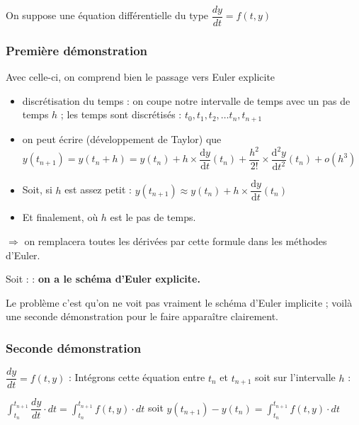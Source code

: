 \documentclass[11pt]{article}
\begin{document}
On suppose une équation différentielle du type $\dfrac{dy}{dt} = f(t,y)$

\subsubsection{Première démonstration}

Avec celle-ci, on comprend bien le passage vers Euler explicite

\begin{itemize}
 \item discrétisation du temps : on coupe notre intervalle de temps avec un pas de temps $h$ ; les temps sont discrétisés : $t_0, t_1, t_2,\ldots t_n, t_{n+1}$
 \item on peut écrire (développement de Taylor) que $y(t_{n+1}) = y(t_n+h) = y(t_n)+h\times \dfrac{\text{d}y}{\text{d}t}(t_n) + \dfrac{h^2}{{2!}}\times \dfrac{\text{d}^2y}{\text{d}t^2}(t_n)+o(h^3)$
 \item Soit, si $h$ est assez petit : $y(t_{n+1}) \approx y(t_n)+h\times \dfrac{\text{d}y}{\text{d}t}(t_n)$
 \item Et finalement,  où $h$ est le pas de temps.
\end{itemize}

$\Longrightarrow$ on remplacera toutes les dérivées par cette formule dans les méthodes d'Euler.



Soit :  :  \textbf{on a le schéma d'Euler explicite.}




Le problème c'est qu'on ne voit pas vraiment le schéma d'Euler implicite ; voilà une seconde démonstration pour le faire apparaître clairement.









\subsubsection{Seconde démonstration}

$\dfrac{dy}{dt} = f(t,y)$ : Intégrons cette équation entre $t_n$ et $t_{n+1}$ soit sur l'intervalle $h$ : 

$\displaystyle \int _{t_n}^{t_{n+1}} \dfrac{dy}{dt}\cdot dt = \int _{t_n}^{t_{n+1}} f(t,y)\cdot dt$
soit $y(t_{n+1}) - y(t_n) = \displaystyle \int _{t_n}^{t_{n+1}} f(t,y)\cdot dt$
\end{document}
